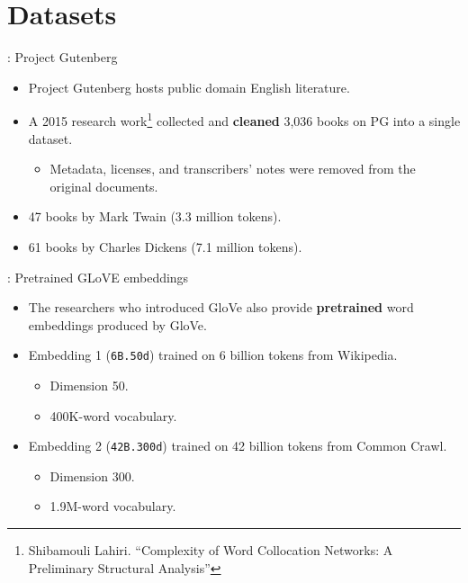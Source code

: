 \documentclass{beamer}
\begin{document}
\section{Datasets}

\begin{frame}{\secname: Project Gutenberg}
\begin{itemize}
\item 
Project Gutenberg hosts public domain English literature.

\item 
A 2015 research work\footnote{
Shibamouli Lahiri. “Complexity of Word Collocation Networks: A Preliminary Structural Analysis”}
collected and \textbf{cleaned} 3,036 books on PG
into a single dataset.
    \begin{itemize}
    \item Metadata, licenses, and transcribers' notes were removed from the original documents.
    
    \end{itemize}
    
\item
47 books by Mark Twain (3.3 million tokens). 

\item
61 books by Charles Dickens (7.1 million tokens).

\end{itemize}
\end{frame}

\begin{frame}{\secname: Pretrained GLoVE embeddings}
\begin{itemize}
\item 
The researchers who introduced GloVe also provide \textbf{pretrained} word embeddings produced by GloVe.

\item 
Embedding 1 (\texttt{6B.50d}) trained on 6 billion tokens from Wikipedia.
    \begin{itemize}
        \item Dimension 50.
        \item 400K-word vocabulary.
    \end{itemize}

\item
Embedding 2 (\texttt{42B.300d}) trained on 42 billion tokens from Common Crawl.
    \begin{itemize}
        \item Dimension 300.
        \item 1.9M-word vocabulary.
    \end{itemize}

\end{itemize}
\end{frame}
\end{document}
